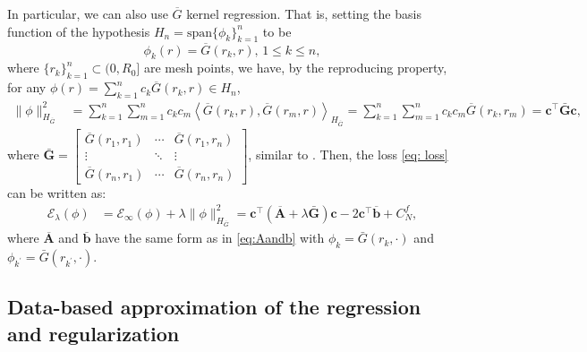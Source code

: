 \documentclass[12pt]{article}
\def\Gbar{ {\overline{G}} }
\def\Abar{ {\overline{A}} }
\def\bbar{ {\overline{b}} }
\numberwithin{equation}{section}
\numberwithin{theorem}{section}
\begin{document}
In particular, we can also use $\Gbar$ kernel regression. That is, setting the basis function of the hypothesis $H_n= \mathrm{span}\{\phi_k\}_{k=1}^n$ to be 
\begin{equation}\label{eq:Gbar_basisFn}
\phi_k(r)=  \Gbar(r_k,r) , \,1\leq k\leq n,  
\end{equation}
where $\{r_k\}_{k=1}^n\subset (0,R_0]$ are mesh points, we have, by the reproducing property, for any  $\phi (r) =\sum_{k=1}^n c_k \Gbar(r_k,r) \in H_n$, 
\begin{equation}
\label{regularkernel}
\begin{aligned}
\|{\phi}\|_{H_{\Gbar}}^2
 & =\sum_{k=1}^n \sum_{m=1}^n c_{k} c_{m} \left\langle \Gbar(r_{k},r), \Gbar(r_{m},r) \right\rangle_{H_{\Gbar}} =\sum_{k=1}^n \sum_{m=1}^n  c_{k} c_{m}\Gbar(r_{k},r_{m})=\mathbf{c}^{\top}\bar{\mathbf{G}}\mathbf{c},
\end{aligned}
\end{equation}
where $\bar{\mathbf{G}} = \begin{bmatrix}
\Gbar(r_1,r_1) & \cdots  &  \Gbar(r_1,r_n)\\
  \vdots & \ddots  & \vdots\\
  \Gbar(r_n,r_1) & \cdots  &  \Gbar(r_n,r_n)
\end{bmatrix}$, similar to \cite{li2025automatic}. Then, the loss \eqref{eq: loss} can be written as: 
\begin{equation}
\label{eq:regularkernelloss}
\begin{aligned}
\mathcal{E}_\lambda(\phi) &=\mathcal{E}_\infty(\phi)+\lambda\|{\phi}\|_{H_{\Gbar}}^2 = \mathbf{c}^{\top}\left( \mathbf{\Abar} + \lambda \bar{\mathbf{G}} \right)\mathbf{c}-2 \mathbf{c}^{\top} \mathbf{\bbar}  + C_N^f, 
\end{aligned}
\end{equation}
where $\mathbf{\Abar}$ and $\mathbf{\bbar}$ have the same form as in \eqref{eq:Aandb} with $\phi_k=\bar{G}\left(r_k, \cdot\right)$ and $\phi_{k^{\prime}}=\bar{G}\left(r_{k^{\prime}}, \cdot\right)$.






\subsection{Data-based approximation of the regression and regularization} 
\label{sec31}
\end{document}
